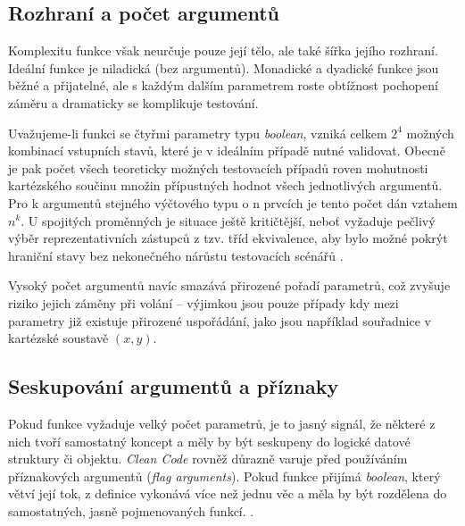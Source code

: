\documentclass[FM,DP,fonts]{tulthesis}
\begin{document}
\subsection{Rozhraní a počet argumentů}
Komplexitu funkce však neurčuje pouze její tělo, ale také šířka jejího rozhraní. Ideální funkce je niladická (bez argumentů). Monadické a dyadické funkce jsou běžné a přijatelné, ale s každým dalším parametrem roste obtížnost pochopení záměru a dramaticky se komplikuje testování.

Uvažujeme-li funkci se čtyřmi parametry typu \textit{boolean}, vzniká celkem $2^4$ možných kombinací vstupních stavů, které je v ideálním případě nutné validovat. Obecně je pak počet všech teoreticky možných testovacích případů roven mohutnosti kartézského součinu množin přípustných hodnot všech jednotlivých argumentů. Pro k argumentů stejného výčtového typu o n prvcích je tento počet dán vztahem $n^k$. U spojitých proměnných je situace ještě kritičtější, neboť vyžaduje pečlivý výběr reprezentativních zástupců z tzv. tříd ekvivalence, aby bylo možné pokrýt hraniční stavy bez nekonečného nárůstu testovacích scénářů \parencite{martin-clean-code}.

Vysoký počet argumentů navíc smazává přirozené pořadí parametrů, což zvyšuje riziko jejich záměny při volání – výjimkou jsou pouze případy kdy mezi parametry již existuje přirozené uspořádání, jako jsou například souřadnice v kartézské soustavě $(x,y)$. \parencite{martin-clean-code}

\subsection{Seskupování argumentů a příznaky}
Pokud funkce vyžaduje velký počet parametrů, je to jasný signál, že některé z nich tvoří samostatný koncept a měly by být seskupeny do logické datové struktury či objektu. \textit{Clean Code} rovněž důrazně varuje před používáním příznakových argumentů (\textit{flag arguments}). Pokud funkce přijímá \textit{boolean}, který větví její tok, z definice vykonává více než jednu věc a měla by být rozdělena do samostatných, jasně pojmenovaných funkcí.  \parencite{martin-clean-code}.
\end{document}
